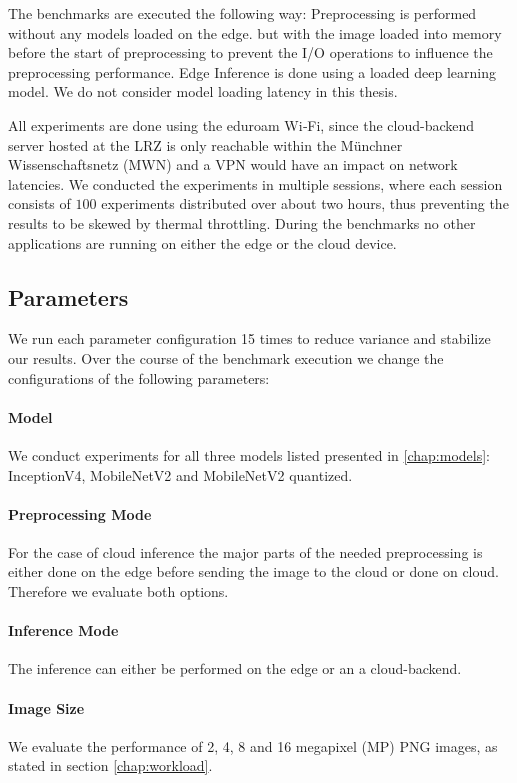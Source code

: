 The benchmarks are executed the following way: 
Preprocessing is performed without any models loaded on the edge. but with the image loaded into memory before the start of preprocessing to prevent the I/O operations to influence the preprocessing performance.
Edge Inference is done using a loaded deep learning model. 
We do not consider model loading latency in this thesis.

All experiments are done using the eduroam Wi‑Fi, since the cloud-backend server hosted at the LRZ is only reachable within the Münchner Wissenschaftsnetz (MWN) and a VPN would have an impact on network latencies.
We conducted the experiments in multiple sessions, where each session consists of $100$ experiments distributed over about two hours, thus preventing the results to be skewed by thermal throttling.
During the benchmarks no other applications are running on either the edge or the cloud device.
\subsection{Parameters}
We run each parameter configuration 15 times to reduce variance and stabilize our results.
Over the course of the benchmark execution we change the configurations of the following parameters:
\paragraph{Model}
We conduct experiments for all three models listed presented in \ref{chap:models}: InceptionV4, MobileNetV2 and MobileNetV2 quantized.

\paragraph{Preprocessing Mode}
For the case of cloud inference the major parts of the needed preprocessing is either done on the edge before sending the image to the cloud or done on cloud. Therefore we evaluate both options.
\paragraph{Inference Mode}
The inference can either be performed on the edge or an a cloud-backend.

\paragraph{Image Size}
We evaluate the performance of 2, 4, 8 and 16  megapixel (MP) PNG images, as stated in section \ref{chap:workload}.

